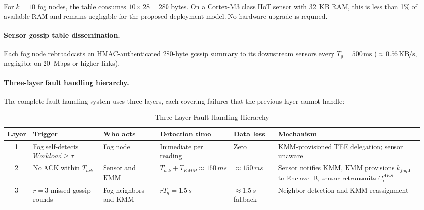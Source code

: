 \documentclass[conference]{IEEEtran}
\begin{document}
    For $k=10$ fog nodes, the table consumes $10\times 28=280$ bytes. On a Cortex-M3 class IIoT sensor with 32~KB RAM, this is less than 1\% of available RAM and remains negligible for the proposed deployment model. No hardware upgrade is required.

    \paragraph{Sensor gossip table dissemination.}
    Each fog node rebroadcasts an HMAC-authenticated 280-byte gossip summary to its downstream sensors every $T_g=500\,\text{ms}$ ($\approx0.56\,\text{KB/s}$, negligible on 20~Mbps or higher links).

    \paragraph{Three-layer fault handling hierarchy.}
    The complete fault-handling system uses three layers, each covering failures that the previous layer cannot handle:

    \begin{table}[htbp]
    \caption{Three-Layer Fault Handling Hierarchy}
    \label{table:fault-hierarchy}
    \centering
    \setlength{\tabcolsep}{3pt}
    \renewcommand{\arraystretch}{1.15}
    \begin{tabular}{@{}c>{\raggedright\arraybackslash}p{}>{\raggedright\arraybackslash}p{}>{\raggedright\arraybackslash}p{}>{\raggedright\arraybackslash}p{}>{\raggedright\arraybackslash}p{}@{}}
    \hline
    \textbf{Layer} & \textbf{Trigger} & \textbf{Who acts} & \textbf{Detection time} & \textbf{Data loss} & \textbf{Mechanism} \\
    \hline
    1 & Fog self-detects $Workload\geq\tau$ & Fog node & Immediate per reading & Zero & KMM-provisioned TEE delegation; sensor unaware \\
    2 & No ACK within $T_{ack}$ & Sensor and KMM & $T_{ack}+T_{KMM}\approx150\,ms$ & $\approx 150\,ms$ & Sensor notifies KMM, KMM provisions $k_{fogA}$ to Enclave~B, sensor retransmits $C_i^{AES}$ \\
    3 & $r=3$ missed gossip rounds & Fog neighbors and KMM & $rT_g=1.5\,s$ & $\approx 1.5\,s$ fallback & Neighbor detection and KMM reassignment \\
    \hline
    \end{tabular}
    \end{table}
\end{document}
